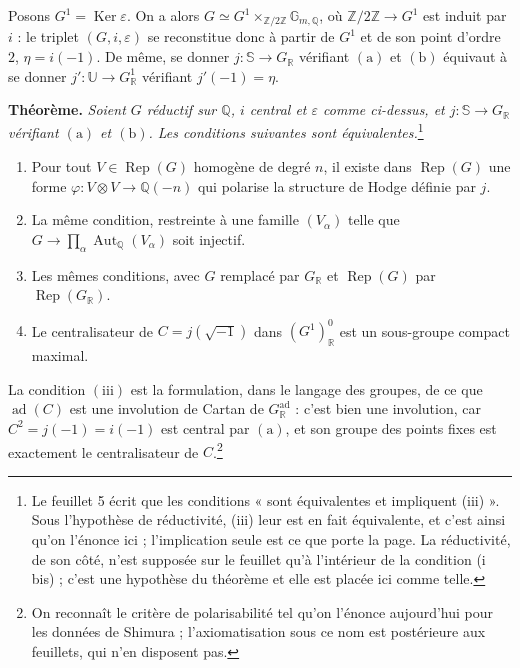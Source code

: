 \documentclass[11pt,a4paper]{article}
\begin{document}
Posons $G^{1} = \operatorname{Ker} \varepsilon$. On a alors
$G \simeq G^{1} \times_{\mathbb{Z}/2\mathbb{Z}} \mathbb{G}_{m,\mathbb{Q}}$, où
$\mathbb{Z}/2\mathbb{Z} \to G^{1}$ est induit par $i$ : le triplet
$(G, i, \varepsilon)$ se reconstitue donc à partir de $G^{1}$ et de son point
d'ordre $2$, $\eta = i(-1)$. De même, se donner $j : \mathbb{S} \to
G_{\mathbb{R}}$ vérifiant $(\mathrm{a})$ et $(\mathrm{b})$ équivaut à se donner
$j' : \mathbb{U} \to G^{1}_{\mathbb{R}}$ vérifiant $j'(-1) = \eta$.

\textbf{Théorème.} \emph{Soient $G$ réductif sur $\mathbb{Q}$, $i$ central et
$\varepsilon$ comme ci-dessus, et $j : \mathbb{S} \to G_{\mathbb{R}}$ vérifiant
$(\mathrm{a})$ et $(\mathrm{b})$. Les conditions suivantes sont
équivalentes.}\footnote{Le feuillet 5 écrit que les conditions « sont
équivalentes et impliquent (iii) ». Sous l'hypothèse de réductivité, (iii) leur
est en fait équivalente, et c'est ainsi qu'on l'énonce ici ; l'implication seule
est ce que porte la page. La réductivité, de son côté, n'est supposée sur le
feuillet qu'à l'intérieur de la condition (i bis) ; c'est une hypothèse du
théorème et elle est placée ici comme telle.}

\begin{enumerate}
  \item[(i)] Pour tout $V \in \operatorname{Rep}(G)$ homogène de degré $n$, il
  existe dans $\operatorname{Rep}(G)$ une forme
  $\varphi : V \otimes V \to \mathbb{Q}(-n)$ qui polarise la structure de Hodge
  définie par $j$.
  \item[(i bis)] La même condition, restreinte à une famille $(V_{\alpha})$
  telle que $G \to \prod_{\alpha} \operatorname{Aut}_{\mathbb{Q}}(V_{\alpha})$
  soit injectif.
  \item[(ii)] Les mêmes conditions, avec $G$ remplacé par $G_{\mathbb{R}}$ et
  $\operatorname{Rep}(G)$ par $\operatorname{Rep}(G_{\mathbb{R}})$.
  \item[(iii)] Le centralisateur de $C = j(\sqrt{-1})$ dans
  $(G^{1})^{0}_{\mathbb{R}}$ est un sous-groupe compact maximal.
\end{enumerate}

La condition $(\mathrm{iii})$ est la formulation, dans le langage des groupes,
de ce que $\operatorname{ad}(C)$ est une involution de Cartan de
$G^{\mathrm{ad}}_{\mathbb{R}}$ : c'est bien une involution, car $C^{2} = j(-1) =
i(-1)$ est central par $(\mathrm{a})$, et son groupe des points fixes est
exactement le centralisateur de $C$.\footnote{On reconnaît le critère de
polarisabilité tel qu'on l'énonce aujourd'hui pour les données de Shimura ;
l'axiomatisation sous ce nom est postérieure aux feuillets, qui n'en disposent
pas.}
\end{document}
